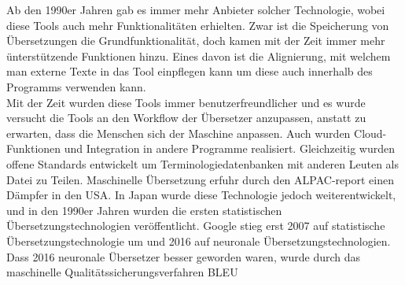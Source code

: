 \documentclass{article}
\begin{document}
	Ab den 1990er Jahren gab es immer mehr Anbieter solcher Technologie, wobei diese Tools auch mehr Funktionalitäten erhielten. Zwar ist die Speicherung von Übersetzungen die Grundfunktionalität, doch kamen mit der Zeit immer mehr ünterstützende Funktionen hinzu. Eines davon ist die Alignierung, mit welchem man externe Texte in das Tool einpflegen kann um diese auch innerhalb des Programms verwenden kann. \\
	Mit der Zeit wurden diese Tools immer benutzerfreundlicher und es wurde versucht die Tools an den Workflow der Übersetzer anzupassen, anstatt zu erwarten, dass die Menschen sich der Maschine anpassen. Auch wurden Cloud-Funktionen und Integration in andere Programme realisiert. Gleichzeitig wurden offene Standards entwickelt um Terminologiedatenbanken mit anderen Leuten als Datei zu Teilen.
	Maschinelle Übersetzung erfuhr durch den ALPAC-report einen Dämpfer in den USA. In Japan wurde diese Technologie jedoch weiterentwickelt, und in den 1990er Jahren wurden die ersten statistischen Übersetzungstechnologien veröffentlicht. Google stieg erst 2007 auf statistische Übersetzungstechnologie um und 2016 auf neuronale Übersetzungstechnologien. Dass 2016 neuronale Übersetzer besser geworden waren, wurde durch das maschinelle Qualitätssicherungsverfahren BLEU
\end{document}
